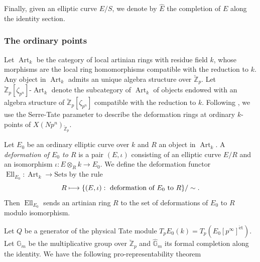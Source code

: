 \documentclass[JEP,XML,SOM,Unicode,published]{cedram}
\newcommand\mto{\mathchoice{\longmapsto}{\mapsto}{\mapsto}{\mapsto}}
\newcommand{\et}{\mathrm{\acute{e}t}}
\numberwithin{equation}{section}
\theoremstyle{definition}
\newcommand{\bb}[1]{\mathbb{#1}}
\DeclareMathOperator{\Ell}{Ell}
\DeclareMathOperator{\Art}{Art}
\begin{document}
Finally, given an elliptic curve $E/S$, we denote by $\widehat{E}$ the completion of $E$ along the identity section.

\subsubsection*{The ordinary points}

Let $\Art_k$ be the category of local artinian rings with residue field $k$, whose morphisms are the local ring homomorphisms compatible with the reduction to $k$. Any object in $\Art_k$ admits an unique algebra structure over $\breve{\bb{Z}}_p$. Let $\breve{\bb{Z}}_p[\zeta_{p^n}]\mbox{-}\Art_k$ denote the subcategory of $\Art_k$ of objects endowed with an algebra structure of $\breve{\bb{Z}}_p[\zeta_{p^n}]$ compatible with the reduction to $k$. Following \cite{katz1981serre}, we use the Serre-Tate parameter to describe the deformation rings at ordinary $k$-points of $X(Np^n)_{\breve{\bb{Z}}_p}$.

Let $E_0$ be an ordinary elliptic curve over $k$ and $R$ an object in $\Art_k$. A \textit{deformation of $E_0$ to $R$} is a pair $(E,\iota)$ consisting of an elliptic curve $E/R$ and an isomorphism $\iota:E\otimes_R k\to E_0$. We define the deformation functor $\Ell_{E_0}: \Art_k \to \mbox{Sets}$ by the rule\vspace*{-3pt}
\[
R \mto \{(E,\iota): \mbox{ deformation of $E_0$ to $R$}\}/\sim.
\]
Then $\Ell_{E_0}$ sends an artinian ring $R$ to the set of deformations of $E_0$ to $R$ modulo isomorphism.

Let $Q$ be a generator of the physical Tate module $T_pE_0(k)=T_p (E_0[p^\infty]^{\et})$. Let $\bb{G}_m$ be the multiplicative group over $\breve{\bb{Z}}_p$ and $\widehat{\bb{G}}_m$ its formal completion along the identity. We have the following pro-representability theorem
\end{document}

